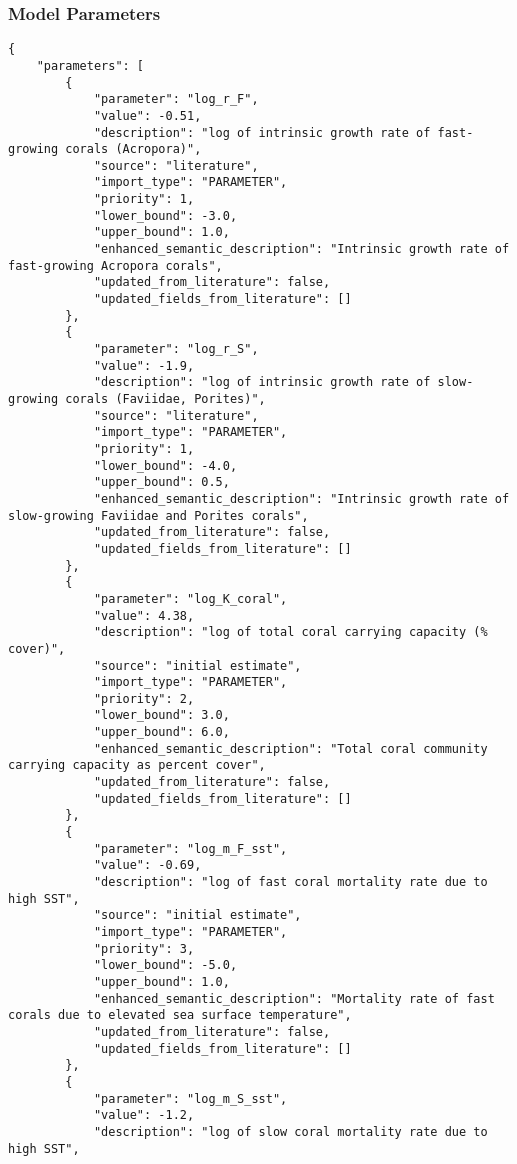 \subsubsection{Model Parameters}
\begin{lstlisting}
{
    "parameters": [
        {
            "parameter": "log_r_F",
            "value": -0.51,
            "description": "log of intrinsic growth rate of fast-growing corals (Acropora)",
            "source": "literature",
            "import_type": "PARAMETER",
            "priority": 1,
            "lower_bound": -3.0,
            "upper_bound": 1.0,
            "enhanced_semantic_description": "Intrinsic growth rate of fast-growing Acropora corals",
            "updated_from_literature": false,
            "updated_fields_from_literature": []
        },
        {
            "parameter": "log_r_S",
            "value": -1.9,
            "description": "log of intrinsic growth rate of slow-growing corals (Faviidae, Porites)",
            "source": "literature",
            "import_type": "PARAMETER",
            "priority": 1,
            "lower_bound": -4.0,
            "upper_bound": 0.5,
            "enhanced_semantic_description": "Intrinsic growth rate of slow-growing Faviidae and Porites corals",
            "updated_from_literature": false,
            "updated_fields_from_literature": []
        },
        {
            "parameter": "log_K_coral",
            "value": 4.38,
            "description": "log of total coral carrying capacity (% cover)",
            "source": "initial estimate",
            "import_type": "PARAMETER",
            "priority": 2,
            "lower_bound": 3.0,
            "upper_bound": 6.0,
            "enhanced_semantic_description": "Total coral community carrying capacity as percent cover",
            "updated_from_literature": false,
            "updated_fields_from_literature": []
        },
        {
            "parameter": "log_m_F_sst",
            "value": -0.69,
            "description": "log of fast coral mortality rate due to high SST",
            "source": "initial estimate",
            "import_type": "PARAMETER",
            "priority": 3,
            "lower_bound": -5.0,
            "upper_bound": 1.0,
            "enhanced_semantic_description": "Mortality rate of fast corals due to elevated sea surface temperature",
            "updated_from_literature": false,
            "updated_fields_from_literature": []
        },
        {
            "parameter": "log_m_S_sst",
            "value": -1.2,
            "description": "log of slow coral mortality rate due to high SST",

\end{lstlisting}
